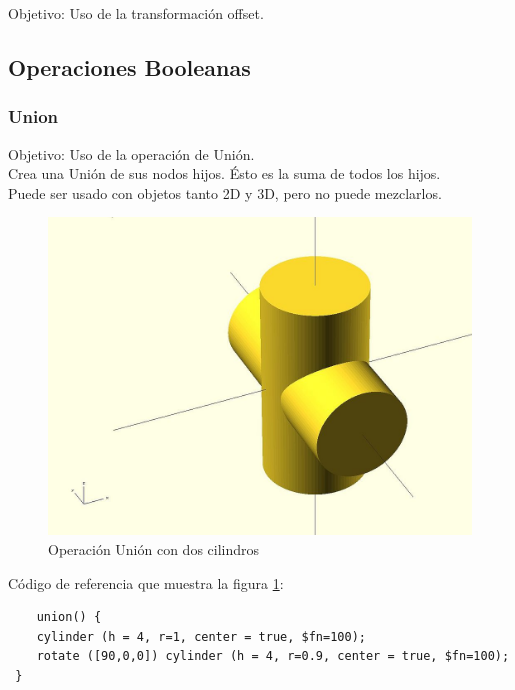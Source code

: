 \documentclass{article}
\begin{document}
Objetivo: Uso de la transformación offset.\citep{OpenSCS}\\


\citep{OpenSCS}

\subsection{Operaciones Booleanas}

\subsubsection{Union}

Objetivo: Uso de la operación de Unión.\citep{OpenSCS}\\


Crea una Unión de sus nodos hijos. Ésto es la suma de todos los hijos.\citep{WikiOpensCAD}\\

Puede ser usado con objetos tanto 2D y 3D, pero no puede mezclarlos.\citep{WikiOpensCAD}\\

\begin{figure}[h!]
    \centering
    \includegraphics{Imagenes/Openscad_union.jpg}
    \caption{Operación Unión con dos cilindros}
    \label{fig:union_cilindros}
\end{figure}

Código de referencia que muestra la figura \ref{fig:union_cilindros}:\\

\begin{verbatim}
    union() {
 	cylinder (h = 4, r=1, center = true, $fn=100);
 	rotate ([90,0,0]) cylinder (h = 4, r=0.9, center = true, $fn=100);
 }
\end{verbatim}
\end{document}
